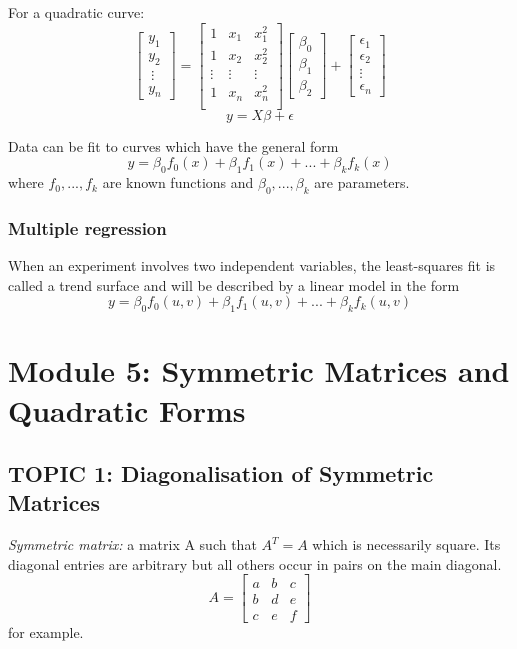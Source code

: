 \documentclass[12pt]{article} %
\begin{document}
For a quadratic curve:
$$\begin{bmatrix}
		y_1\\
		y_2\\\
		\vdots\\
		y_n
	\end{bmatrix} = \begin{bmatrix}
		1 & x_1 & x_1^2\\ 
		1 & x_2 & x_2^2\\ 
		\vdots & \vdots & \vdots\\
		1 & x_n & x_n^2\\ 
	\end{bmatrix} \begin{bmatrix}
		\beta_0\\
		\beta_1\\
		\beta_2
	\end{bmatrix} + \begin{bmatrix}
		\epsilon_1\\
		\epsilon_2\\
		\vdots\\
		\epsilon_n
	\end{bmatrix}$$
$$y = X \beta + \epsilon$$

Data can be fit to curves which have the general form 
$$y = \beta_0 f_0 (x) + \beta_1 f_1 (x) + ... + \beta_k f_k (x)$$
where $f_0, ..., f_k$ are known functions and $\beta_0, ..., \beta_k$ are parameters. 

\subsubsection{Multiple regression}
When an experiment involves two independent variables, the least-squares fit is called a trend surface and will be described by a linear model in the form 
$$y = \beta_0 f_0(u, v) + \beta_1 f_1(u, v) + ... + \beta_k f_k(u, v)$$

\pagebreak
\section{Module 5: Symmetric Matrices and Quadratic Forms}
\subsection{TOPIC 1: Diagonalisation of Symmetric Matrices}
\emph{Symmetric matrix:} a matrix A such that $A^T = A$ which is necessarily square. Its diagonal entries are arbitrary but all others occur in pairs on the main diagonal.
$$A = \begin{bmatrix}
	a & b & c\\
	b & d & e\\
	c & e & f
\end{bmatrix}$$
for example. 
\end{document}
